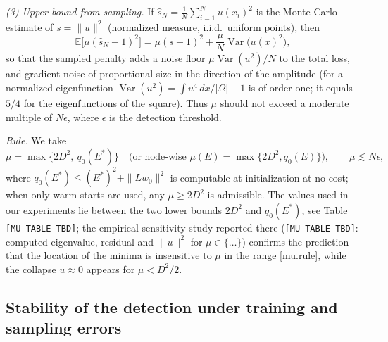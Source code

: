 \begin{remark}
\emph{(3) Upper bound from sampling.} If $\hat s_N=\frac1N\sum_{i=1}^Nu(x_i)^2$ is the
Monte Carlo estimate of $s=\|u\|^2$ (normalized measure, i.i.d.\ uniform points), then
\begin{equation}\label{mc.floor}
\mathbb E\big[\mu(\hat s_N-1)^2\big]=\mu(s-1)^2+\frac{\mu}{N}\operatorname{Var}\big(u(x)^2\big),
\end{equation}
so that the sampled penalty adds a noise floor $\mu\operatorname{Var}(u^2)/N$ to the total
loss, and gradient noise of proportional size in the direction of the amplitude
(for a normalized eigenfunction $\operatorname{Var}(u^2)=\int u^4\,dx/|\Omega|-1$ is of
order one; it equals $5/4$ for the eigenfunctions of the square). Thus $\mu$ should not
exceed a moderate multiple of $N\epsilon$, where $\epsilon$ is the detection threshold.

\emph{Rule.} We take
\begin{equation}\label{mu.rule}
\mu=\max\big\{2D^2,\ q_0(E^*)\big\}\quad\text{(or node-wise } \mu(E)=\max\{2D^2,q_0(E)\}\text{)},
\qquad \mu\lesssim N\epsilon,
\end{equation}
where $q_0(E^*)\le (E^*)^2+\|Lw_0\|^2$ is computable at initialization at no cost; when
only warm starts are used, any $\mu\ge 2D^2$ is admissible. The values used in our
experiments lie between the two lower bounds $2D^2$ and $q_0(E^*)$, see Table
\texttt{[MU-TABLE-TBD]}; the empirical sensitivity study reported there
(\texttt{[MU-TABLE-TBD]}: computed eigenvalue, residual and $\|u\|^2$ for
$\mu\in\{\dots\}$) confirms the prediction that the location of the minima is insensitive
to $\mu$ in the range \eqref{mu.rule}, while the collapse $u\approx0$ appears for
$\mu<D^2/2$.
\end{remark}



\subsection*{Stability of the detection under training and sampling errors}

